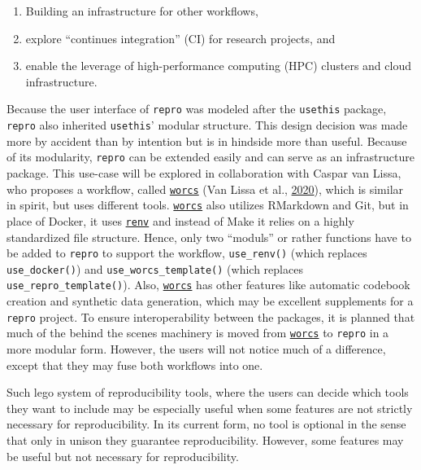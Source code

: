 \documentclass[12pt,a4paper,twoside]{article}
\providecommand{\tightlist}{%
  \setlength{\itemsep}{0pt}\setlength{\parskip}{0pt}}
\begin{document}
\begin{enumerate}
\def\labelenumi{\arabic{enumi}.}
\tightlist
\item
  Building an infrastructure for other workflows,
\item
  explore ``continues integration'' (CI) for research projects, and
\item
  enable the leverage of high-performance computing (HPC) clusters and cloud infrastructure.
\end{enumerate}

Because the user interface of \texttt{repro} was modeled after the \texttt{usethis} package, \texttt{repro} also inherited \texttt{usethis}' modular structure.
This design decision was made more by accident than by intention but is in hindside more than useful.
Because of its modularity, \texttt{repro} can be extended easily and can serve as an infrastructure package.
This use-case will be explored in collaboration with Caspar van Lissa, who proposes a workflow, called \href{https://cjvanlissa.github.io/worcs/}{\texttt{worcs}} (Van Lissa et al., \protect\hyperlink{ref-vanlissaWORCSWorkflowOpen2020}{2020}), which is similar in spirit, but uses different tools.
\href{https://cjvanlissa.github.io/worcs/}{\texttt{worcs}} also utilizes RMarkdown and Git, but in place of Docker, it uses \href{https://rstudio.github.io/renv/articles/renv.html}{\texttt{renv}} and instead of Make it relies on a highly standardized file structure.
Hence, only two ``moduls'' or rather functions have to be added to \texttt{repro} to support the workflow, \texttt{use\_renv()} (which replaces \texttt{use\_docker()}) and \texttt{use\_worcs\_template()} (which replaces \texttt{use\_repro\_template()}).
Also, \href{https://cjvanlissa.github.io/worcs/}{\texttt{worcs}} has other features like automatic codebook creation and synthetic data generation, which may be excellent supplements for a \texttt{repro} project.
To ensure interoperability between the packages, it is planned that much of the behind the scenes machinery is moved from \href{https://cjvanlissa.github.io/worcs/}{\texttt{worcs}} to \texttt{repro} in a more modular form.
However, the users will not notice much of a difference, except that they may fuse both workflows into one.

Such lego system of reproducibility tools, where the users can decide which tools they want to include may be especially useful when some features are not strictly necessary for reproducibility.
In its current form, no tool is optional in the sense that only in unison they guarantee reproducibility.
However, some features may be useful but not necessary for reproducibility.
\end{document}
